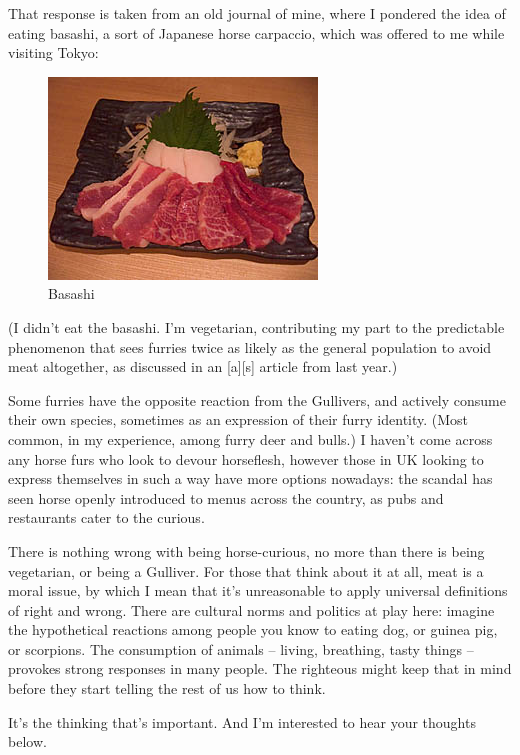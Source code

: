 That response is taken from an old journal of mine, where I pondered the idea of eating basashi, a sort of Japanese horse carpaccio, which was offered to me while visiting Tokyo:

\begin{figure}
  \begin{center}
    \includegraphics{content/assets/horsemeat--basashi}
  \end{center}
  \caption{Basashi}
\end{figure}

(I didn't eat the basashi. I'm vegetarian, contributing my part to the predictable phenomenon that sees furries twice as likely as the general population to avoid meat altogether, as discussed in an [a][s] article from last year.)

Some furries have the opposite reaction from the Gullivers, and actively consume their own species, sometimes as an expression of their furry identity. (Most common, in my experience, among furry deer and bulls.) I haven't come across any horse furs who look to devour horseflesh, however those in UK looking to express themselves in such a way have more options nowadays: the scandal has seen horse openly introduced to menus across the country, as pubs and restaurants cater to the curious.

There is nothing wrong with being horse-curious, no more than there is being vegetarian, or being a Gulliver. For those that think about it at all, meat is a moral issue, by which I mean that it's unreasonable to apply universal definitions of right and wrong. There are cultural norms and politics at play here: imagine the hypothetical reactions among people you know to eating dog, or guinea pig, or scorpions. The consumption of animals -- living, breathing, tasty things -- provokes strong responses in many people. The righteous might keep that in mind before they start telling the rest of us how to think.

It's the thinking that's important. And I'm interested to hear your thoughts below.
